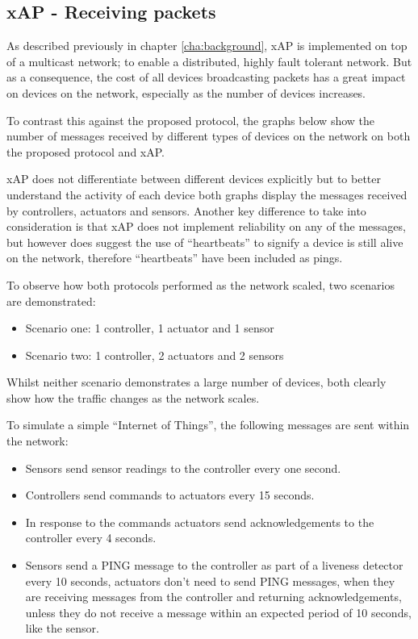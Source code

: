 \subsection{xAP - Receiving packets} %
\label{sub:xap}
As described previously in chapter \ref{cha:background}, xAP is implemented on top of a multicast network; to enable a distributed, highly fault tolerant network. But as a consequence, the cost of all devices broadcasting packets has a great impact on devices on the network, especially as the number of devices increases. 

To contrast this against the proposed protocol, the graphs below show the number of messages received by different types of devices on the network on both the proposed protocol and xAP.

xAP does not differentiate between different devices explicitly but to better understand the activity of each device both graphs display the messages received by controllers, actuators and sensors. Another key difference to take into consideration is that xAP does not implement reliability on any of the messages, but however does suggest the use of ``heartbeats'' to signify a device is still alive on the network, therefore ``heartbeats'' have been included as pings.

To observe how both protocols performed as the network scaled, two scenarios are demonstrated:\vspace{-5mm} 
\begin{itemize}
    \item Scenario one: 1 controller, 1 actuator and 1 sensor
    \item Scenario two: 1 controller, 2 actuators and 2 sensors
\end{itemize}
Whilst neither scenario demonstrates a large number of devices, both clearly show how the traffic changes as the network scales.

To simulate a simple ``Internet of Things'', the following messages are sent within the network:\vspace{-5mm} 
\begin{itemize}
    \item Sensors send sensor readings to the controller every one second.
    \item Controllers send commands to actuators every 15 seconds.
    \item In response to the commands actuators send acknowledgements to the controller every 4 seconds.
    \item Sensors send a PING message to the controller as part of a liveness detector every 10 seconds, actuators don't need to send PING messages, when they are receiving messages from the controller and returning acknowledgements, unless they do not receive a message within an expected period of 10 seconds, like the sensor. 
\end{itemize}

